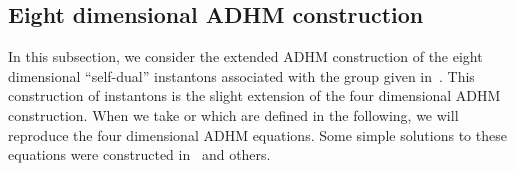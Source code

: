 \documentclass[a4paper,12pt]{article}
\begin{document}
\subsection{Eight dimensional ADHM construction}

In this subsection, we consider the extended ADHM construction of the 
eight dimensional ``self-dual'' instantons associated with the \coordHE{} 
group given in~\cite{ward, cgk}.
This construction of instantons is the slight extension of 
the four dimensional ADHM construction.
When we take \coordHE{} or \coordHE{} which are defined 
in the following, 
we will reproduce the four dimensional ADHM equations. 
Some simple solutions to these equations
 were constructed in~\cite{ns, nekrasov, 
furuuchi, furuuchi2, furuuchi3} and others.
\end{document}
